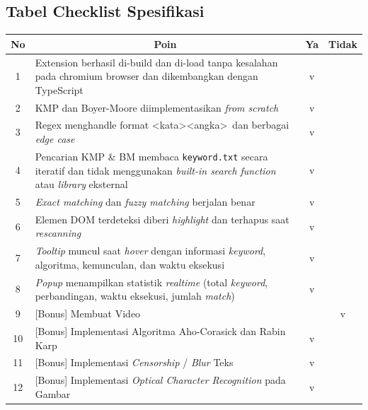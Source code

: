 \subsection{Tabel Checklist Spesifikasi}
\begin{table}[H]
    \centering
    \renewcommand{\arraystretch}{1.5} 
    \begin{tabular}{|c|p{10cm}|c|c|}
        \hline
        \textbf{No} & \multicolumn{1}{c|}{\textbf{Poin}} & \textbf{Ya} & \textbf{Tidak} \\
        \hline
        1 & Extension berhasil di-build dan di-load tanpa kesalahan pada chromium browser dan dikembangkan dengan TypeScript & v & \\
        \hline
        2 & KMP dan Boyer-Moore diimplementasikan \textit{from scratch} & v & \\
        \hline
        3 & Regex menghandle format \textless kata\textgreater\textless angka\textgreater\ dan berbagai \textit{edge case} & v & \\
        \hline
        4 & Pencarian KMP \& BM membaca \texttt{keyword.txt} secara iteratif dan tidak menggunakan \textit{built-in search function} atau \textit{library} eksternal & v & \\
        \hline
        5 & \textit{Exact matching} dan \textit{fuzzy matching} berjalan benar & v & \\
        \hline
        6 & Elemen DOM terdeteksi diberi \textit{highlight} dan terhapus saat \textit{rescanning} & v & \\
        \hline
        7 & \textit{Tooltip} muncul saat \textit{hover} dengan informasi \textit{keyword}, algoritma, kemunculan, dan waktu eksekusi & v & \\
        \hline
        8 & \textit{Popup} menampilkan statistik \textit{realtime} (total \textit{keyword}, perbandingan, waktu eksekusi, jumlah \textit{match}) & v & \\
        \hline
        9 & {[Bonus]} Membuat Video & & v \\
        \hline
        10 & {[Bonus]} Implementasi Algoritma Aho-Corasick dan Rabin Karp & v & \\
        \hline
        11 & {[Bonus]} Implementasi \textit{Censorship} / \textit{Blur} Teks & v & \\
        \hline
        12 & {[Bonus]} Implementasi \textit{Optical Character Recognition} pada Gambar & v & \\
        \hline
    \end{tabular}
\end{table}

